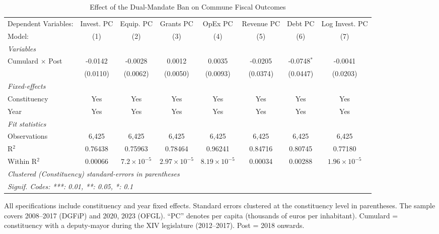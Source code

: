 
\begin{table}[htbp]
   \caption{\label{tab:main} Effect of the Dual-Mandate Ban on Commune Fiscal Outcomes}
   \centering
   \begin{adjustbox}{max width=\textwidth}
   \begin{tabular}{lccccccc}
      \tabularnewline \midrule \midrule
      Dependent Variables:    & Invest. PC & Equip. PC            & Grants PC             & OpEx PC               & Revenue PC & Debt PC       & Log Invest. PC\\  
      Model:                  & (1)        & (2)                  & (3)                   & (4)                   & (5)        & (6)           & (7)\\  
      \midrule
      \emph{Variables}\\
      Cumulard $\times$ Post  & -0.0142    & -0.0028              & 0.0012                & 0.0035                & -0.0205    & -0.0748$^{*}$ & -0.0041\\   
                              & (0.0110)   & (0.0062)             & (0.0050)              & (0.0093)              & (0.0374)   & (0.0447)      & (0.0203)\\   
      \midrule
      \emph{Fixed-effects}\\
      Constituency            & Yes        & Yes                  & Yes                   & Yes                   & Yes        & Yes           & Yes\\  
      Year                    & Yes        & Yes                  & Yes                   & Yes                   & Yes        & Yes           & Yes\\  
      \midrule
      \emph{Fit statistics}\\
      Observations            & 6,425      & 6,425                & 6,425                 & 6,425                 & 6,425      & 6,425         & 6,425\\  
      R$^2$                   & 0.76438    & 0.75963              & 0.78464               & 0.96241               & 0.84716    & 0.80745       & 0.77180\\  
      Within R$^2$            & 0.00066    & $7.2\times 10^{-5}$  & $2.97\times 10^{-5}$  & $8.19\times 10^{-5}$  & 0.00034    & 0.00288       & $1.96\times 10^{-5}$\\   
      \midrule \midrule
      \multicolumn{8}{l}{\emph{Clustered (Constituency) standard-errors in parentheses}}\\
      \multicolumn{8}{l}{\emph{Signif. Codes: ***: 0.01, **: 0.05, *: 0.1}}\\
   \end{tabular}
   \end{adjustbox}

   \par \raggedright 
   All specifications include constituency and year fixed effects. Standard errors clustered at the constituency level in parentheses. The sample covers 2008--2017 (DGFiP) and 2020, 2023 (OFGL). ``PC'' denotes per capita (thousands of euros per inhabitant). Cumulard = constituency with a deputy-mayor during the XIV legislature (2012--2017). Post = 2018 onwards.
\end{table}


